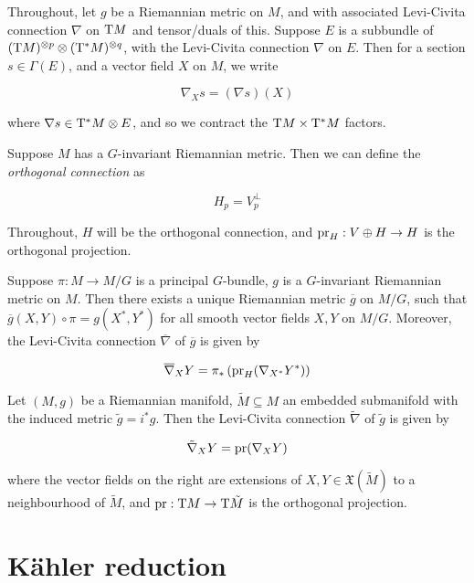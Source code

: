 \documentclass{article}
\begin{document}
Throughout, let \(g\) be a Riemannian metric on \(M\), and with associated Levi-Civita connection \(\nabla\) on \(\mathrm{T} M\) and tensor/duals of this. Suppose \(E\) is a subbundle of \((\mathrm{T} M)^{\otimes p} \otimes (\mathrm{T} ^*M)^{\otimes q}\), with the Levi-Civita connection \(\nabla\) on \(E\). Then for a section \(s \in \Gamma(E)\), and a vector field \(X\) on \(M\), we write

\[\nabla_Xs = (\nabla s)(X)\]

where \(\nabla s \in \mathrm{T}^* M \otimes E\), and so we contract the \(\mathrm{T} M \times \mathrm{T}^*M\) factors.

\begin{definition}
     Suppose \(M\) has a \(G\)-invariant Riemannian metric. Then we can define the \emph{orthogonal connection} as

    \[H_p = V_p^\perp\]
\end{definition}

Throughout, \(H\) will be the orthogonal connection, and \(\operatorname{pr}_H : V \oplus H \to H\) is the orthogonal projection.

\begin{theorem}
     Suppose \(\pi : M \to M/G\) is a principal \(G\)-bundle, \(g\) is a \(G\)-invariant Riemannian metric on \(M\). Then there exists a unique Riemannian metric \(\overline g\) on \(M/G\), such that \(\overline g(X, Y) \circ \pi = g(X^*, Y^*)\) for all smooth vector fields \(X, Y\) on \(M/G\). Moreover, the Levi-Civita connection \(\overline\nabla\) of \(\overline g\) is given by

    \[\overline \nabla_X Y = \pi_*\left(\operatorname{pr}_H(\nabla_{X^*}Y^*)\right)\]
\end{theorem}

\begin{theorem}
     Let \((M, g)\) be a Riemannian manifold, \(\tilde M \subseteq M\) an embedded submanifold with the induced metric \(\tilde g = i^*g\). Then the Levi-Civita connection \(\tilde\nabla\) of \(\tilde g\) is given by

    \[\tilde\nabla_X Y = \operatorname{pr}(\nabla_XY)\]

    where the vector fields on the right are extensions of \(X, Y \in \mathfrak X(\tilde M)\) to a neighbourhood of \(\tilde M\), and \(\operatorname{pr} : \mathrm{T} M \to \mathrm{T} \tilde M\) is the orthogonal projection.
\end{theorem}

\section{K\"ahler reduction}
\end{document}
